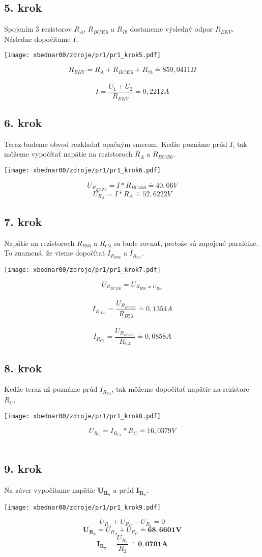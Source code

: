 \subsection*{5. krok}
Spojením 3 rezistorov $R_A$, $R_{BC456}$ a $R_{78}$ dostaneme výsledný odpor $R_{EKV}$.
Následne dopočítame $I$.
\begin{center}
\texttt{[image: xbednar00/zdroje/pr1/pr1\_krok5.pdf]}
\end{center}
$$R_{EKV}=R_A+R_{BC456}+R_{78}\doteq859,0411\Omega$$\\ 
$$I=\frac{U_1+U_2}{R_{EKV}}\doteq0,2212A$$

\newpage
\subsection*{6. krok}
Teraz budeme obvod rozkladať opačným smerom. Kedže poznáme prúd $I$, tak môžeme vypočítať napätie na rezistoroch $R_A$ a $R_{BC456}$.
\begin{center}
\texttt{[image: xbednar00/zdroje/pr1/pr1\_krok6.pdf]}
\end{center}
$$U_{R_{BC456}}=I*R_{BC456}\doteq40,06V$$
$$U_{R_A}=I*R_A\doteq52,6222V$$

\subsection*{7. krok}
Napätie na rezistoroch $R_{B56}$ a $R_{C4}$ sa bude rovnať, pretože sú zapojené paralélne. To znamená, že vieme dopočítať $I_{R_{B56}}$ a $I_{R_{C4}}$.
\begin{center}
\texttt{[image: xbednar00/zdroje/pr1/pr1\_krok7.pdf]}
\end{center}
$$U_{R_{BC456}}=U_{R_{B56}=U_{R_{C4}}}$$\\
$$I_{R_{B56}}=\frac{U_{R_{BC456}}}{R_{B56}}\doteq0,1354A$$\\
$$I_{R_{C4}}=\frac{U_{R_{BC456}}}{R_{C4}}\doteq0,0858A$$

\newpage
\subsection*{8. krok}
Kedže teraz už poznáme prúd $I_{R_{C4}}$, tak môžeme dopočítať napätie na rezistore $R_C$.
\begin{center}
\texttt{[image: xbednar00/zdroje/pr1/pr1\_krok8.pdf]}
\end{center}
$$U_{R_C}=I_{R_{C4}}*R_C\doteq16,0379V$$\\

\subsection*{9. krok}
Na záver vypočítame napätie $\pmb{U_{R_2}}$ a prúd $\pmb{I_{R_2}}$.
\begin{center}
\texttt{[image: xbednar00/zdroje/pr1/pr1\_krok9.pdf]}
\end{center}
$$U_{R_A}+U_{R_C}-U_{R_2}=0$$
$$\pmb{U_{R_2}}=U_{R_A}+U_{R_C}\doteq\pmb{68,6601V}$$
$$\pmb{I_{R_2}}=\frac{U_{R_2}}{R_2}\doteq\pmb{0,0701A}$$